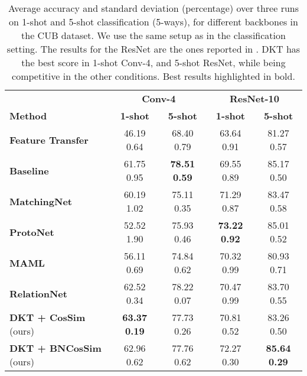 \documentclass{article}
\begin{document}
\begin{table}[H]
\caption{Average accuracy and standard deviation (percentage) over three runs on 1-shot and 5-shot classification (5-ways), for different backbones in the CUB dataset. We use the same setup as in the classification setting. The results for the ResNet are the ones reported in \citet{chen2019closerfewshot}. DKT has the best score in 1-shot Conv-4, and 5-shot ResNet, while being competitive in the other conditions. Best results highlighted in bold.}
\centering
\begin{tabular}{lcccc}
\hline
\textbf{} & \multicolumn{2}{c}{\textbf{Conv-4}} & \multicolumn{2}{c}{\textbf{ResNet-10}} \\
\small{\textbf{Method}} & \textbf{1-shot}& \textbf{5-shot} & \textbf{1-shot} & \textbf{5-shot} \\ 
\hline
\small{\textbf{Feature Transfer}}
& 46.19  \small{0.64} & 68.40  \small{0.79} & 63.64  \small{0.91} & 81.27  \small{0.57}\\
\small{\textbf{Baseline}} \citep{chen2019closerfewshot} & 61.75  \small{0.95} & \textbf{78.51  \small{0.59}} & 69.55  \small{0.89} & 85.17  \small{0.50}\\
\small{\textbf{MatchingNet}} \citep{vinyals2016matching} & 60.19  \small{1.02} & 75.11  \small{0.35} & 71.29  \small{0.87} & 83.47  \small{0.58}\\
\small{\textbf{ProtoNet}} \citep{snell2017prototypical} & 52.52  \small{1.90} & 75.93  \small{0.46} & \textbf{73.22  \small{0.92}} & 85.01  \small{0.52}\\
\small{\textbf{MAML}}  \citep{finn2017model} & 56.11  \small{0.69} & 74.84  \small{0.62}  & 70.32  \small{0.99} & 80.93  \small{0.71}\\
\small{\textbf{RelationNet}} \citep{sung2018learning} & 62.52  \small{0.34} & 78.22  \small{0.07}  & 70.47  \small{0.99} & 83.70  \small{0.55}\\
\hline
\small{\textbf{DKT + CosSim}} (ours) & \textbf{63.37  \small{0.19}} & 77.73  \small{0.26} & 70.81  \small{0.52} & 83.26  \small{0.50}\\
\small{\textbf{DKT + BNCosSim}} (ours) & 62.96  \small{0.62} & 77.76  \small{0.62} & 72.27  \small{0.30} & \textbf{85.64  \small{0.29}}\\
\hline
\end{tabular}
\label{tab_backbone_accuracy}
\end{table}
\end{document}
